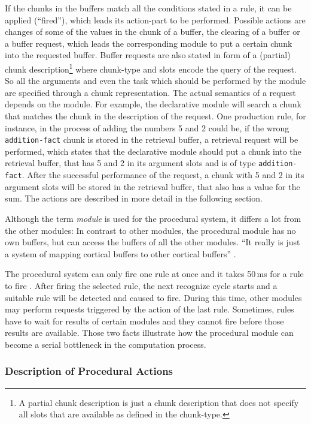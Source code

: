 If the chunks in the buffers match all the conditions stated in a rule, it can be applied (``fired''), which leads its action-part to be performed. Possible actions are changes of some of the values in the chunk of a buffer, the clearing of a buffer or a buffer request, which leads the corresponding module to put a certain chunk into the requested buffer. Buffer requests are also stated in form of a (partial) chunk description\footnote{A partial chunk description is just a chunk description that does not specify all slots that are available as defined in the chunk-type.} where chunk-type and slots encode the query of the request. So all the arguments and even the task which should be performed by the module are specified through a chunk representation. The actual semantics of a request depends on the module. For example, the declarative module will search a chunk that matches the chunk in the description of the request. One production rule, for instance, in the process of adding the numbers 5 and 2 could be, if the wrong \verb|addition-fact| chunk is stored in the retrieval buffer, a retrieval request will be performed, which states that the declarative module should put a chunk into the retrieval buffer, that has 5 and 2 in its argument slots and is of type \verb|addition-fact|. After the successful performance of the request, a chunk with 5 and 2 in its argument slots will be stored in the retrieval buffer, that also has a value for the sum. The actions are described in more detail in the following section.

Although the term \emph{module} is used for the procedural system, it differs a lot from the other modules: In contrast to other modules, the procedural module has no own buffers, but can access the buffers of all the other modules. ``It really is just a system of mapping cortical buffers to other cortical buffers'' \cite[p. 54]{anderson_how_2007}.

The procedural system can only fire one rule at once and it takes 50\,ms for a rule to fire \cite[p. 54]{anderson_how_2007}. After firing the selected rule, the next recognize cycle starts and a suitable rule will be detected and caused to fire. During this time, other modules may perform requests triggered by the action of the last rule. Sometimes, rules have to wait for results of certain modules and they cannot fire before those results are available. Those two facts illustrate how the procedural module can become a serial bottleneck in the computation process.

\subsubsection{Description of Procedural Actions}
\label{description_of_proc_actions}

